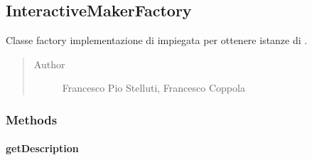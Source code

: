 \documentclass[letterpaper,10pt,italian,openany,oneside]{sphinxmanual}
\begin{document}
\begin{fulllineitems}
\label{\detokenize{source/it/unicam/cs/pa/mastermind/factories/InteractiveBreakerFactory:it.unicam.cs.pa.mastermind.factories.InteractiveBreakerFactory.getName()}}
\end{fulllineitems}



\subsection{InteractiveMakerFactory}
\label{\detokenize{source/it/unicam/cs/pa/mastermind/factories/InteractiveMakerFactory:interactivemakerfactory}}\label{\detokenize{source/it/unicam/cs/pa/mastermind/factories/InteractiveMakerFactory::doc}}

\begin{fulllineitems}
\label{\detokenize{source/it/unicam/cs/pa/mastermind/factories/InteractiveMakerFactory:it.unicam.cs.pa.mastermind.factories.InteractiveMakerFactory}}
Classe factory implementazione di  impiegata per ottenere istanze di .
\begin{quote}\begin{description}
\item[{Author}] \leavevmode
Francesco Pio Stelluti, Francesco Coppola

\end{description}\end{quote}

\end{fulllineitems}



\subsubsection{Methods}
\label{\detokenize{source/it/unicam/cs/pa/mastermind/factories/InteractiveMakerFactory:methods}}

\paragraph{getDescription}
\label{\detokenize{source/it/unicam/cs/pa/mastermind/factories/InteractiveMakerFactory:getdescription}}
\end{document}
